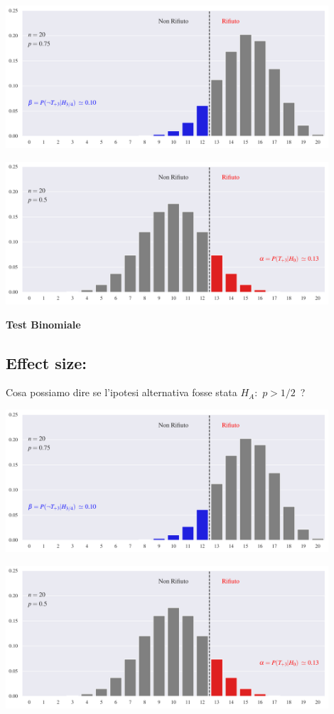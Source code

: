 \documentclass[11pt,openany]{book}
\begin{document}
\hfil\includegraphics[width=0.9\textwidth]{figure/B-test_02.pdf}

\hfil\includegraphics[width=0.9\textwidth]{figure/B-test_01.pdf}




\clearpage\hfill\textbf{Test Binomiale}\subsection{Effect size: \boldmath{$\delta$}}


Cosa possiamo dire se l'ipotesi alternativa fosse stata $H_A:$ $p>1/2$~?

\hfil\includegraphics[width=0.9\textwidth]{figure/B-test_02.pdf}

\hfil\includegraphics[width=0.9\textwidth]{figure/B-test_01.pdf}
\end{document}
